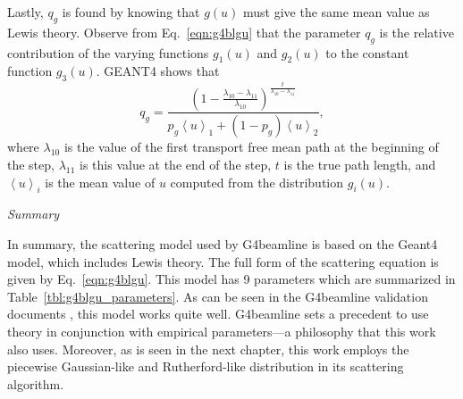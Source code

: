 Lastly, $q_g$ is found by knowing that $g(u)$ must give the same mean value as Lewis theory. Observe from Eq.~\eqref{eqn:g4blgu} that the parameter $q_g$ is the relative contribution of the varying functions $g_1(u)$ and $g_2(u)$ to the constant function $g_3(u)$. GEANT4 \cite{geant4} shows that
%
\begin{equation}
q_g=\frac{(1-\frac{\lambda_{10}-\lambda_{11}}{\lambda_{10}})^{\frac{t}{\lambda_{10}-\lambda_{11}}}}{p_g\left<u\right>_1+(1-p_g)\left<u\right>_2},
\label{eqn:geantq}
\end{equation}
where $\lambda_{10}$ is the value of the first transport free mean path at the beginning of the step, $\lambda_{11}$ is this value at the end of the step, $t$ is the true path length, and $\left<u\right>_i$ is the mean value of $u$ computed from the distribution $g_i(u)$.

\noindent \textit{\large{Summary}}

In summary, the scattering model used by G4beamline is based on the Geant4 model, which includes Lewis theory. The full form of the scattering equation is given by Eq.~\eqref{eqn:g4blgu}. This model has 9 parameters which are summarized in Table~\ref{tbl:g4blgu_parameters}. As can be seen in the G4beamline validation documents \cite{g4bl}, this model works quite well. G4beamline sets a precedent to use theory in conjunction with empirical parameters---a philosophy that this work also uses. Moreover, as is seen in the next chapter, this work employs the piecewise Gaussian-like and Rutherford-like distribution in its scattering algorithm.